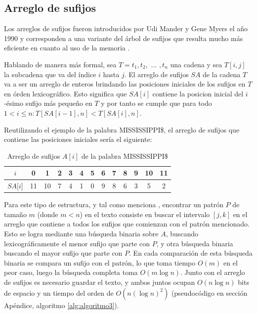 \subsection{Arreglo de sufijos}

Los arreglos de sufijos fueron introducidos por Udi Mander y Gene Myers el año 1990 \cite{suffixarray1} y corresponden a una variante del árbol de sufijos que resulta mucho más eficiente en cuanto al uso de la memoria \cite{licenciado}. 

Hablando de manera más formal, sea $T=t_{1}, t_{2},$ $\ldots$ $,t_{n}$ una cadena y sea $T[i,j]$ la subcadena que va del índice $i$ hasta $j$. El arreglo de sufijos $SA$ de la cadena $T$ va a ser un arreglo de enteros brindando las posiciones iniciales de los sufijos en $T$ en órden lexicográfico. Esto significa que $SA[i]$ contiene la posicion inicial del $i$-ésimo sufijo más pequeño en $T$ y por tanto se cumple que para todo $1 < i \leq n: T[SA[i-1],n] < T[SA[i],n]$. 

Reutilizando el ejemplo de la palabra MISSISSIPPI\$, el arreglo de sufijos que contiene las posiciones iniciales sería el siguiente:

\begin{table}[h]
\centering
\label{my-label9}
\begin{tabular}{|
>{\columncolor[HTML]{EFEFEF}}c|c|c|c|c|c|c|c|c|c|c|c|c|}
\hline
$i$        & 0  & 1  & 2 & 3 & 4 & 5 & 6 & 7 & 8 & 9 & 10 & 11 \\ \hline
$SA{[}i{]}$ & 11 & 10 & 7 & 4 & 1 & 0 & 9 & 8 & 6 & 3 & 5  & 2  \\ \hline
\end{tabular}
\caption{Arreglo de sufijos $A[i]$ de la palabra MISSISSIPPI\$}
\end{table} 

Para este tipo de estructura, y tal como menciona \cite{abeliuk}, encontrar un patrón $P$ de tamaño $m$ (donde $m < n$) en el texto consiste en buscar el intervalo $[j,k]$ en el arreglo que contiene a todos los sufijos que comienzan con el patrón mencionado. Esto se logra mediante una búsqueda binaria sobre $A$, buscando lexicográficamente el menor sufijo que parte con $P$, y otra búsqueda binaria buscando el mayor sufijo que parte con $P$. En cada comparación de esta búsqueda binaria se compara un sufijo con el patrón, lo que toma tiempo $O(m)$ en el peor caso, luego la búsqueda completa toma $O(m \log n)$. Junto con el arreglo de sufijos es necesario guardar el texto, y ambos juntos ocupan $O(n \log n)$ bits de espacio y un tiempo del orden de $O(n (\log n)^{2})$ \cite{suffixarray2} (pseudocódigo en sección Apéndice, algoritmo \ref{alg:algoritmo3}).

